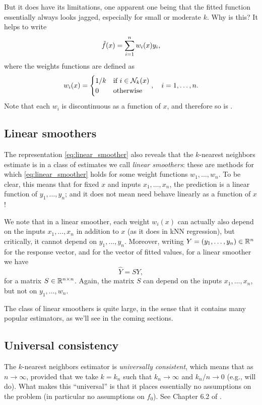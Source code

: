 \documentclass{article}
\begin{document}
But it does have its limitations, one apparent one being that the fitted
function \smash{$\hf$} essentially always looks jagged, especially for small or
moderate $k$. Why is this?  It helps to write 
\begin{equation}
\label{eq:linear_smoother}
\hat{f}(x) = \sum_{i=1}^n w_i(x) y_i,
\end{equation}
where the weights functions are defined as
\[
w_i(x) = \begin{cases}
1/k & \text{if $i \in \mathcal{N}_k(x)$} \\ 
0 & \text{otherwise}
\end{cases}, \quad i=1,\dots,n.
\]
Note that each $w_i$ is discontinuous as a function of $x$, and therefore so is 
\smash{$\hf$}.

\subsection{Linear smoothers}

The representation \eqref{eq:linear_smoother} also reveals that the $k$-nearest
neighbors estimate is in a class of estimates we call \emph{linear smoothers}:
these are methods for which \eqref{eq:linear_smoother} holds for some weight
functions $w_1,\dots,w_n$. To be clear, this means that for fixed $x$ and inputs
$x_1,\dots,x_n$, the prediction  is a linear function of
$y_1,\dots,y_n$; and it does not mean \smash{$\hf$} need behave linearly as a
function of $x$!  

We note that in a linear smoother, each weight $w_i(x)$ can actually also depend
on the inputs $x_1,\dots,x_n$ in addition to $x$ (as it does in kNN regression),
but critically, it cannot depend on $y_1,\dots,y_n$. Moreover, writing $Y =
(y_1,\dots,y_n) \in \mathbb{R}^n$ for the response vector, and  for the vector of fitted values, for a
linear smoother we have 
\[
\hat{Y} = S Y,
\]
for a matrix $S \in \mathbb{R}^{n \times n}$. Again, the matrix $S$ can depend on the
inputs $x_1,\dots,x_n$, but not on $y_1,\dots,w_n$. 

The class of linear smoothers is quite large, in the sense that it contains many
popular estimators, as we'll see in the coming sections.

\subsection{Universal consistency}

The $k$-nearest neighbors estimator is \emph{universally consistent}, which
means that  as $n \to \infty$, provided that we
take $k=k_n$ such that $k_n \to \infty$ and $k_n/n \to 0$ (e.g.,
 will do). What makes this ``universal'' is that it places
essentially no assumptions on the problem (in particular no assumptions on
$f_0$). See Chapter 6.2 of \citet{gyorfi2002distribution}. 
\end{document}
